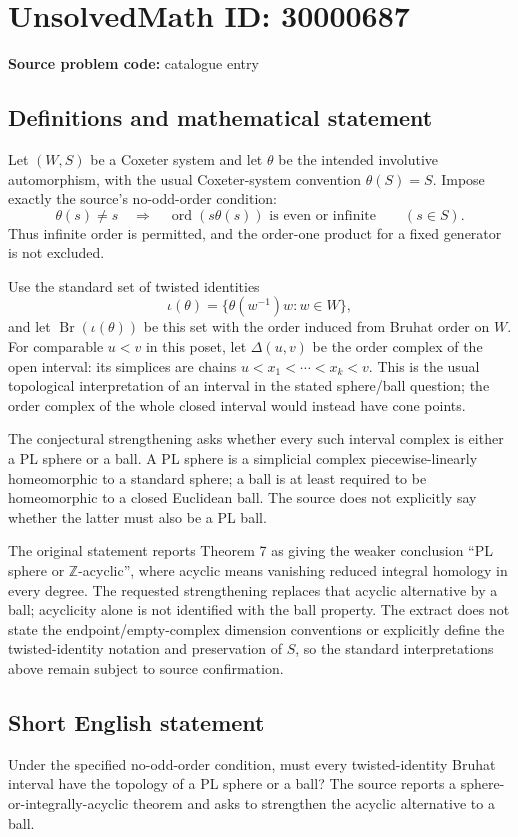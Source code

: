 \documentclass[11pt]{article}
\newcommand{\Z}{\mathbb{Z}}
\begin{document}
\section*{UnsolvedMath ID: 30000687}
\textbf{Source problem code:} catalogue entry
\subsection{Definitions and mathematical statement}
Let $(W,S)$ be a Coxeter system and let $\theta$ be the intended involutive automorphism, with the usual Coxeter-system convention $\theta(S)=S$. Impose exactly the source's no-odd-order condition:
\[
\theta(s)\ne s\quad\Longrightarrow\quad
\operatorname{ord}(s\theta(s))\text{ is even or infinite}
\qquad(s\in S).
\]
Thus infinite order is permitted, and the order-one product for a fixed generator is not excluded.

Use the standard set of twisted identities
\[
\iota(\theta)=\{\theta(w^{-1})w:w\in W\},
\]
and let $\operatorname{Br}(\iota(\theta))$ be this set with the order induced from Bruhat order on $W$. For comparable $u<v$ in this poset, let $\Delta(u,v)$ be the order complex of the open interval: its simplices are chains $u<x_1<\cdots<x_k<v$. This is the usual topological interpretation of an interval in the stated sphere/ball question; the order complex of the whole closed interval would instead have cone points.

The conjectural strengthening asks whether every such interval complex is either a PL sphere or a ball. A PL sphere is a simplicial complex piecewise-linearly homeomorphic to a standard sphere; a ball is at least required to be homeomorphic to a closed Euclidean ball. The source does not explicitly say whether the latter must also be a PL ball.

The original statement reports Theorem 7 as giving the weaker conclusion ``PL sphere or $\Z$-acyclic'', where acyclic means vanishing reduced integral homology in every degree. The requested strengthening replaces that acyclic alternative by a ball; acyclicity alone is not identified with the ball property. The extract does not state the endpoint/empty-complex dimension conventions or explicitly define the twisted-identity notation and preservation of $S$, so the standard interpretations above remain subject to source confirmation.
\subsection{Short English statement}
Under the specified no-odd-order condition, must every twisted-identity Bruhat interval have the topology of a PL sphere or a ball? The source reports a sphere-or-integrally-acyclic theorem and asks to strengthen the acyclic alternative to a ball.
\end{document}
